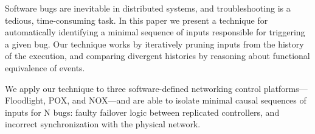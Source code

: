 Software bugs are inevitable in distributed systems, and troubleshooting
is a tedious, time-consuming task.
In this paper we present a technique for automatically identifying
a minimal sequence of inputs responsible for triggering a given bug.
Our technique works by
iteratively pruning inputs from the history of the execution, and
comparing divergent histories
by reasoning about functional equivalence of events.

We apply our technique to three software-defined networking control
platforms---Floodlight, POX, and NOX---and
are able to isolate minimal causal sequences of inputs for
\num{N} bugs: faulty failover logic between replicated controllers, and incorrect
synchronization with the physical network.
